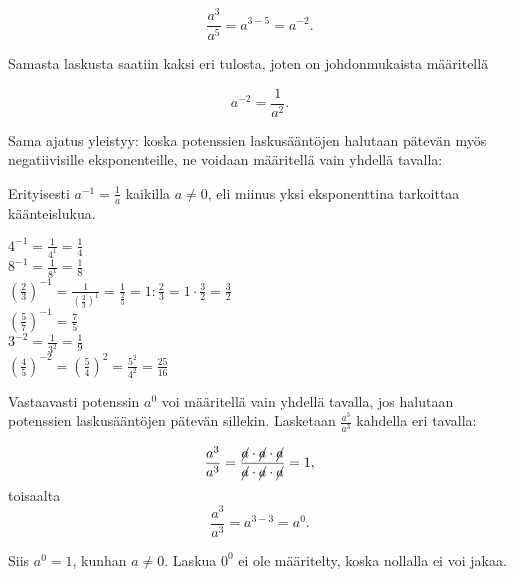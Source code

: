     \begin{equation*}
        \frac{a^3}{a^5} = a^{3-5}= a^{-2}{.}
    \end{equation*}
    
Samasta laskusta saatiin kaksi eri tulosta, joten on johdonmukaista määritellä
    
    \begin{equation*}
        a^{-2} = \frac{1}{a^2}.
    \end{equation*}

Sama ajatus yleistyy: koska potenssien laskusääntöjen halutaan pätevän myös negatiivisille eksponenteille, ne voidaan määritellä vain yhdellä tavalla:
  

Erityisesti $a^{-1}=\frac{1}{a}$ kaikilla $a \neq 0$, eli miinus yksi eksponenttina tarkoittaa käänteislukua.
    
\begin{esimerkki}

$4^{-1}=\frac{1}{4^1}=\frac{1}{4}$ \\
$8^{-1}=\frac{1}{8^1}=\frac{1}{8}$ \\
$(\frac{2}{3})^{-1}=\frac{1}{(\frac{2}{3})^{1}}=\frac{1}{\frac{2}{3}}=1:\frac{2}{3}=1\cdot \frac{3}{2}=\frac{3}{2}$ \\
$(\frac{5}{7})^{-1}=\frac{7}{5}$\\
$3^{-2}=\frac{1}{3^2}=\frac{1}{9}$\\
$(\frac{4}{5})^{-2}=(\frac{5}{4})^2=\frac{5^2}{4^2}=\frac{25}{16}$\\
 
\end{esimerkki}


Vastaavasti potenssin $a^0$ voi määritellä vain yhdellä tavalla, jos halutaan potenssien laskusääntöjen pätevän sillekin. Lasketaan $\frac{a^3}{a^3}$ kahdella eri tavalla:

    \[
        \frac{a^3}{a^3}=\frac{\cancel{a}\cdot \cancel{a}\cdot \cancel{a}}
        {\cancel{a}\cdot \cancel{a}\cdot \cancel{a}}=1,
    \]
	toisaalta
 \[ \frac{a^3}{a^3}=a^{3-3}=a^0. \]

Siis $a^0=1$, kunhan $a\neq 0$.  Laskua $0^0$ ei ole määritelty, koska
nollalla ei voi jakaa. 
 
  

